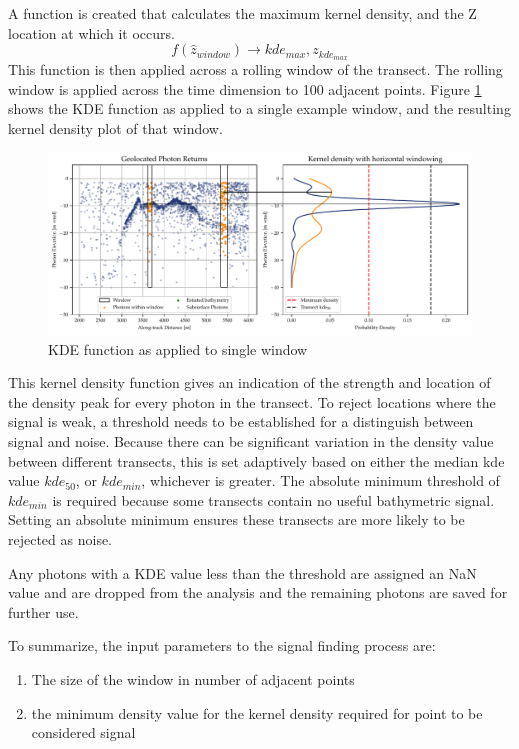 A function is created that calculates the maximum kernel density, and the Z location at which it occurs. $$ f(\hat{z}_{window}) \rightarrow kde_{max},z_{kde_{max}} $$ This function is then applied across a rolling window of the transect. The rolling window is applied across the time dimension to 100 adjacent points. Figure \ref{fig:kdefunc} shows the KDE function as applied to a single example window, and the resulting kernel density plot of that window.

\begin{figure}[htbp]
    \centering
    \includegraphics[width=\textwidth]{figures/2d_kde_plot.pdf}
    \caption{KDE function as applied to single window}
    \label{fig:kdefunc}
\end{figure}

This kernel density function gives an indication of the strength and location of the density peak for every photon in the transect. To reject locations where the signal is weak, a threshold needs to be established for a distinguish between signal and noise. Because there can be significant variation in the density value between different transects, this is set adaptively based on either the median kde value $kde_{50}$, or $kde_{min}$, whichever is greater. The absolute minimum threshold of $kde_{min}$ is required because some transects contain no useful bathymetric signal. Setting an absolute minimum ensures these transects are more likely to be rejected as noise. 

Any photons with a KDE value less than the threshold are assigned an NaN value and are dropped from the analysis and the remaining photons are saved for further use.

To summarize, the input parameters to the signal finding process are:

\begin{enumerate}
    \item The size of the window in number of adjacent points
    \item the minimum density value for the kernel density required for point to be considered signal
\end{enumerate}

